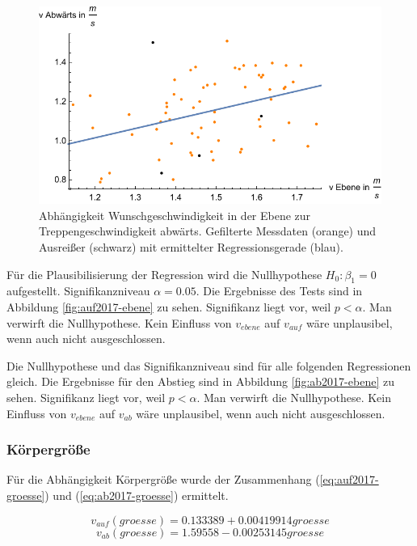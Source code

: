 \begin{figure} \centering 
	\includegraphics[]{abbildungen/regression/2017/ohneausreisser/ab-ebene.pdf}
	
	\caption{Abhängigkeit Wunschgeschwindigkeit in der Ebene zur Treppengeschwindigkeit abwärts. Gefilterte Messdaten (orange) und Ausreißer (schwarz) mit ermittelter Regressionsgerade (blau).
	\label{fig:ohne-ab-ebene}}
\end{figure}

Für die Plausibilisierung der Regression wird die Nullhypothese 
$H_0: \beta_1 = 0$ aufgestellt. Signifikanzniveau $\alpha = 0.05$.
Die Ergebnisse des Tests sind in Abbildung \ref{fig:auf2017-ebene} zu sehen.
Signifikanz liegt vor, weil $p < \alpha$. Man verwirft die
Nullhypothese. Kein Einfluss von $v_{ebene}$ auf $v_{auf}$ wäre unplausibel, wenn auch nicht ausgeschlossen.

Die Nullhypothese und das Signifikanzniveau sind für alle folgenden Regressionen gleich. Die Ergebnisse für den Abstieg sind in Abbildung \ref{fig:ab2017-ebene} zu sehen.
Signifikanz liegt vor, weil $p < \alpha$. Man verwirft die
Nullhypothese. Kein Einfluss von $v_{ebene}$ auf $v_{ab}$ wäre unplausibel, wenn auch nicht ausgeschlossen.

\subsubsection{Körpergröße}

Für die Abhängigkeit Körpergröße wurde 
der Zusammenhang (\ref{eq:auf2017-groesse}) und (\ref{eq:ab2017-groesse}) ermittelt.

\begin{equation} \label{eq:auf2017-groesse}
	v_{auf}(groesse) = 0.133389 + 0.00419914 groesse
\end{equation}
\begin{equation} \label{eq:ab2017-groesse}
	v_{ab}(groesse) = 1.59558 - 0.00253145 groesse
\end{equation}

